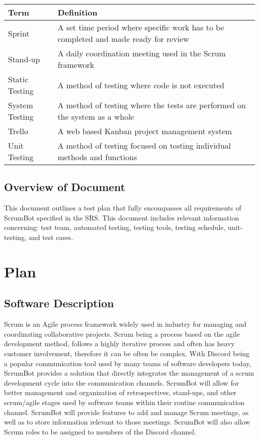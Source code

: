 \documentclass[12pt, titlepage]{article}
\begin{document}
\begin{table}[]
    \centering
    \begin{tabularx}{\textwidth}{p{4cm}X}
        \toprule
        \textbf{Term} & \textbf{Definition}\\
        \midrule
        Sprint & A set time period where specific work has to be completed and made ready for review\\
        Stand-up & A daily coordination meeting used in the Scrum framework\\
        Static Testing & A method of testing where code is not executed\\
        System Testing & A method of testing where the tests are performed on the system as a whole\\
        Trello & A web based Kanban project management system\\
        Unit Testing & A method of testing focused on testing individual methods and functions\\
        \bottomrule
    \end{tabularx}
\end{table}

\newpage

\subsection{Overview of Document}
This document outlines a test plan that fully encompasses all requirements of ScrumBot specified in the SRS. This document includes relevant information concerning: test team, automated testing, testing tools, testing schedule, unit-testing, and test cases.

\section{Plan}
\subsection{Software Description}
Scrum is an Agile process framework widely used in industry for managing and coordinating collaborative projects. Scrum being a process based on the agile development method, follows a highly iterative process and often has heavy customer involvement, therefore it can be often be complex. With Discord being a popular communication tool used by many teams of software developers today, ScrumBot provides a solution that directly integrates the management of a scrum development cycle into the communication channels. ScrumBot will allow for better management and organization of retrospectives, stand-ups, and other scrum/agile stages used by software teams within their routine communication channel. ScrumBot will provide features to add and manage Scrum meetings, as well as to store information relevant to those meetings. ScrumBot will also allow Scrum roles to be assigned to members of the Discord channel.
\end{document}
